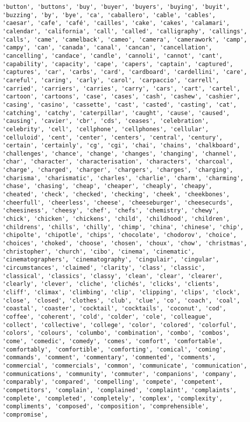 \documentclass[11pt]{article}
\begin{document}
\begin{Verbatim}[commandchars=\\\{\}]
'button', 'buttons', 'buy', 'buyer', 'buyers', 'buying', 'buyit', 'buzzing', 'by', 'bye', 'ca', 'caballero', 'cable', 'cables', 'caesar', 'cafe', 'café', 'cailles', 'cake', 'cakes', 'calamari', 'calendar', 'california', 'call', 'called', 'calligraphy', 'callings', 'calls', 'came', 'camelback', 'cameo', 'camera', 'camerawork', 'camp', 'campy', 'can', 'canada', 'canal', 'cancan', 'cancellation', 'cancelling', 'candace', 'candle', 'cannoli', 'cannot', 'cant', 'capability', 'capacity', 'cape', 'capers', 'captain', 'captured', 'captures', 'car', 'carbs', 'card', 'cardboard', 'cardellini', 'care', 'careful', 'caring', 'carly', 'carol', 'carpaccio', 'carrell', 'carried', 'carriers', 'carries', 'carry', 'cars', 'cart', 'cartel', 'cartoon', 'cartoons', 'case', 'cases', 'cash', 'cashew', 'cashier', 'casing', 'casino', 'cassette', 'cast', 'casted', 'casting', 'cat', 'catching', 'catchy', 'caterpillar', 'caught', 'cause', 'caused', 'causing', 'cavier', 'cbr', 'cds', 'ceases', 'celebration', 'celebrity', 'cell', 'cellphone', 'cellphones', 'cellular', 'celluloid', 'cent', 'center', 'centers', 'central', 'century', 'certain', 'certainly', 'cg', 'cgi', 'chai', 'chains', 'chalkboard', 'challenges', 'chance', 'change', 'changes', 'changing', 'channel', 'char', 'character', 'characterisation', 'characters', 'charcoal', 'charge', 'charged', 'charger', 'chargers', 'charges', 'charging', 'charisma', 'charismatic', 'charles', 'charlie', 'charm', 'charming', 'chase', 'chasing', 'cheap', 'cheaper', 'cheaply', 'cheapy', 'cheated', 'check', 'checked', 'checking', 'cheek', 'cheekbones', 'cheerfull', 'cheerless', 'cheese', 'cheeseburger', 'cheesecurds', 'cheesiness', 'cheesy', 'chef', 'chefs', 'chemistry', 'chewy', 'chick', 'chicken', 'chickens', 'child', 'childhood', 'children', 'childrens', 'chills', 'chilly', 'chimp', 'china', 'chinese', 'chip', 'chipolte', 'chipotle', 'chips', 'chocolate', 'chodorov', 'choice', 'choices', 'choked', 'choose', 'chosen', 'choux', 'chow', 'christmas', 'christopher', 'church', 'cibo', 'cinema', 'cinematic', 'cinematographers', 'cinematography', 'cingulair', 'cingular', 'circumstances', 'claimed', 'clarity', 'class', 'classic', 'classical', 'classics', 'classy', 'clean', 'clear', 'clearer', 'clearly', 'clever', 'cliche', 'clichés', 'clicks', 'clients', 'cliff', 'climax', 'climbing', 'clip', 'clipping', 'clips', 'clock', 'close', 'closed', 'clothes', 'club', 'clue', 'co', 'coach', 'coal', 'coastal', 'coaster', 'cocktail', 'cocktails', 'coconut', 'cod', 'coffee', 'coherent', 'cold', 'colder', 'cole', 'colleague', 'collect', 'collective', 'college', 'color', 'colored', 'colorful', 'colors', 'colours', 'columbo', 'combination', 'combo', 'combos', 'come', 'comedic', 'comedy', 'comes', 'comfort', 'comfortable', 'comfortably', 'comfortible', 'comforting', 'comical', 'coming', 'commands', 'comment', 'commentary', 'commented', 'comments', 'commercial', 'commercials', 'common', 'communicate', 'communication', 'communications', 'community', 'commuter', 'companions', 'company', 'comparably', 'compared', 'compelling', 'compete', 'competent', 'competitors', 'complain', 'complained', 'complaint', 'complaints', 'complete', 'completed', 'completely', 'complex', 'complexity', 'compliments', 'composed', 'composition', 'comprehensible', 'compromise', 
\end{Verbatim}
\end{document}
